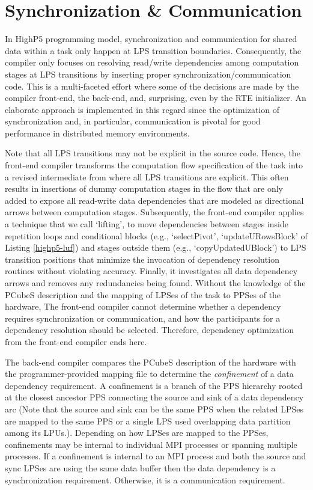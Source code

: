 \documentclass[ASNA,twocolumn]{USG} %
\begin{document}
{\section{Synchronization \& Communication}
\label{sec:sync-primitives}
In HighP5 programming model, synchronization and communication for shared data within a task only happen at LPS transition boundaries. Consequently, the compiler only focuses on resolving read/write dependencies among computation stages at LPS transitions by inserting proper synchronization/communication code. This is a multi-faceted effort where some of the decisions are made by the compiler front-end, the back-end, and, surprising, even by the RTE initializer. An elaborate approach is implemented in this regard since the optimization of synchronization and, in particular, communication is pivotal for good performance in distributed memory environments. 

Note that all LPS transitions may not be explicit in the source code. Hence, the front-end compiler transforms the computation flow specification of the task into a revised intermediate from where all LPS transitions are explicit. This often results in insertions of dummy computation stages in the flow that are only added to expose all read-write data dependencies that are modeled as directional arrows between computation stages. Subsequently, the front-end compiler applies a technique that we call `lifting', to move dependencies between stages inside repetition loops and conditional blocks (e.g., `selectPivot', `updateURowsBlock' of Listing \ref{highp5-luf}) and stages outside them (e.g., `copyUpdatedUBlock') to LPS transition positions that minimize the invocation of dependency resolution routines without violating accuracy. Finally, it investigates all data dependency arrows and removes any redundancies being found. Without the knowledge of the PCubeS description and the mapping of LPSes of the task to PPSes of the hardware, The front-end compiler cannot determine whether a dependency requires synchronization or communication, and how the participants for a dependency resolution should be selected. Therefore, dependency optimization from the front-end compiler ends here. 

The back-end compiler compares the PCubeS description of the hardware with the programmer-provided mapping file to determine the \textit{confinement} of a data dependency requirement. A confinement is a branch of the PPS hierarchy rooted at the closest ancestor PPS connecting the source and sink of a data dependency arc (Note that the source and sink can be the same PPS when the related LPSes are mapped to the same PPS or a single LPS used overlapping data partition among its LPUs.). Depending on how LPSes are mapped to the PPSes, confinements may be internal to individual MPI processes or spanning multiple processes. If a confinement is internal to an MPI process and both the source and sync LPSes are using the same data buffer then the data dependency is a synchronization requirement. Otherwise, it is a communication requirement. 

}
\end{document}
